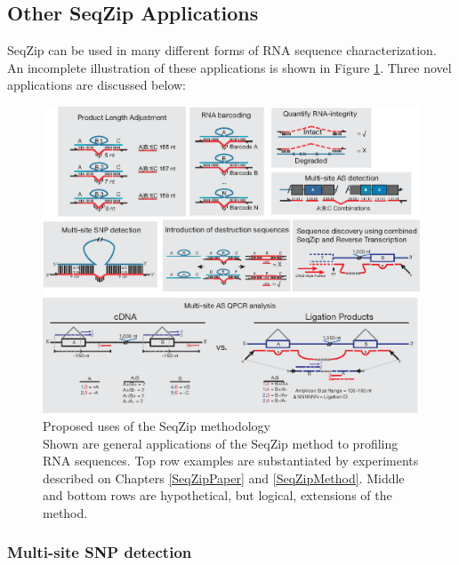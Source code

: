   \subsection{Other SeqZip Applications}
    \label{Disc:subsec:Future Uses of SeqZip}

    SeqZip can be used in many different forms of RNA sequence characterization. An incomplete illustration of these applications is shown in Figure \ref{Disc:fig: Panel of SeqZip Applications}. Three novel applications are discussed below:

    \begin{figure} %
      \centering 
      \includegraphics{Figures/Discussion/SeqZipUses.eps}
      \caption[Proposed uses of the SeqZip methodology]
      {Proposed uses of the SeqZip methodology \\[0.25cm]
        Shown are general applications of the SeqZip method to profiling RNA sequences. Top row examples are substantiated by experiments described on Chapters \ref{SeqZipPaper} and \ref{SeqZipMethod}.  Middle and bottom rows are hypothetical, but logical, extensions of the method.
        }
      \label{Disc:fig: Panel of SeqZip Applications}
      \end{figure}

    \subsubsection{Multi-site SNP detection}
      \label{Disc:subsubsec: Multi-site SNP Detection}

